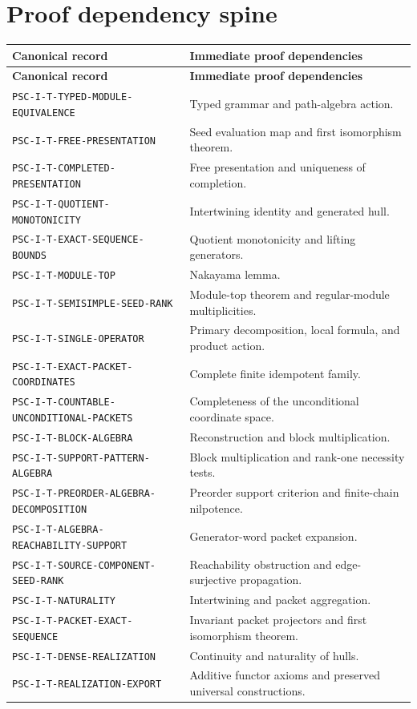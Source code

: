 \documentclass[11pt]{article}
\theoremstyle{definition}
\theoremstyle{remark}
\theoremstyle{definition}\newtheorem{example}[theorem]{Example}
\begin{document}
\section{Proof dependency spine}

\small
\begin{longtable}{@{}p{}p{}@{}}
\toprule
\textbf{Canonical record} & \textbf{Immediate proof dependencies}\\
\midrule
\endfirsthead
\toprule
\textbf{Canonical record} & \textbf{Immediate proof dependencies}\\
\midrule
\endhead
\texttt{PSC-I-T-TYPED-MODULE-EQUIVALENCE} & Typed grammar and path-algebra action.\\
\texttt{PSC-I-T-FREE-PRESENTATION} & Seed evaluation map and first isomorphism theorem.\\
\texttt{PSC-I-T-COMPLETED-PRESENTATION} & Free presentation and uniqueness of completion.\\
\texttt{PSC-I-T-QUOTIENT-MONOTONICITY} & Intertwining identity and generated hull.\\
\texttt{PSC-I-T-EXACT-SEQUENCE-BOUNDS} & Quotient monotonicity and lifting generators.\\
\texttt{PSC-I-T-MODULE-TOP} & Nakayama lemma.\\
\texttt{PSC-I-T-SEMISIMPLE-SEED-RANK} & Module-top theorem and regular-module multiplicities.\\
\texttt{PSC-I-T-SINGLE-OPERATOR} & Primary decomposition, local formula, and product action.\\
\texttt{PSC-I-T-EXACT-PACKET-COORDINATES} & Complete finite idempotent family.\\
\texttt{PSC-I-T-COUNTABLE-}\newline\texttt{UNCONDITIONAL-PACKETS} & Completeness of the unconditional coordinate space.\\
\texttt{PSC-I-T-BLOCK-ALGEBRA} & Reconstruction and block multiplication.\\
\texttt{PSC-I-T-SUPPORT-PATTERN-ALGEBRA} & Block multiplication and rank-one necessity tests.\\
\texttt{PSC-I-T-PREORDER-}\newline\texttt{ALGEBRA-DECOMPOSITION} & Preorder support criterion and finite-chain nilpotence.\\
\texttt{PSC-I-T-ALGEBRA-}\newline\texttt{REACHABILITY-SUPPORT} & Generator-word packet expansion.\\
\texttt{PSC-I-T-SOURCE-COMPONENT-SEED-RANK} & Reachability obstruction and edge-surjective propagation.\\
\texttt{PSC-I-T-NATURALITY} & Intertwining and packet aggregation.\\
\texttt{PSC-I-T-PACKET-EXACT-SEQUENCE} & Invariant packet projectors and first isomorphism theorem.\\
\texttt{PSC-I-T-DENSE-REALIZATION} & Continuity and naturality of hulls.\\
\texttt{PSC-I-T-REALIZATION-EXPORT} & Additive functor axioms and preserved universal constructions.\\
\bottomrule
\end{longtable}
\normalsize
\end{document}
